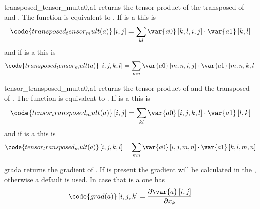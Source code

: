 \begin{funcdesc}{transposed_tensor_mult}{a0,a1}
returns the tensor product of the transposed of  and .
The function is equivalent to .
If  is a \RankTwo this is
\begin{equation}
\code{transposed_tensor_mult(a)}\left[i,j\right]=\sum_{kl}\var{a0}\left[k,l,i,j\right] \cdot \var{a1} \left[k,l\right]
\end{equation}
and if  is a \RankFour this is
\begin{equation}
\code{transposed_tensor_mult(a)}\left[i,j,k,l\right]=\sum_{mn}\var{a0} \left[m,n,i,j\right] \cdot \var{a1} \left[m,n,k,l\right]
\end{equation}
\end{funcdesc}

\begin{funcdesc}{tensor_transposed_mult}{a0,a1}
returns the tensor product of  and the transposed of .
The function is equivalent to .
If  is a \RankTwo this is
\begin{equation}
\code{tensor_transposed_mult(a)}\left[i,j\right]=\sum_{kl}\var{a0}\left[i,j,k,l\right] \cdot \var{a1} \left[l,k\right]
\end{equation}
and if  is a \RankFour this is
\begin{equation}
\code{tensor_transposed_mult(a)}\left[i,j,k,l\right]=\sum_{mn}\var{a0} \left[i,j,m,n\right] \cdot \var{a1} \left[k,l,m,n\right]
\end{equation}
\end{funcdesc}

\begin{funcdesc}{grad}{a}
returns the gradient of . If  is present the gradient will
be calculated in the \FunctionSpace {}, otherwise a default
\FunctionSpace is used. In case that  is a \RankTwo one has
\begin{equation}
\code{grad(a)}\left[i,j,k\right]=\frac{\partial \var{a} \left[i,j\right]}{\partial x_{k}}
\end{equation}
\end{funcdesc}

